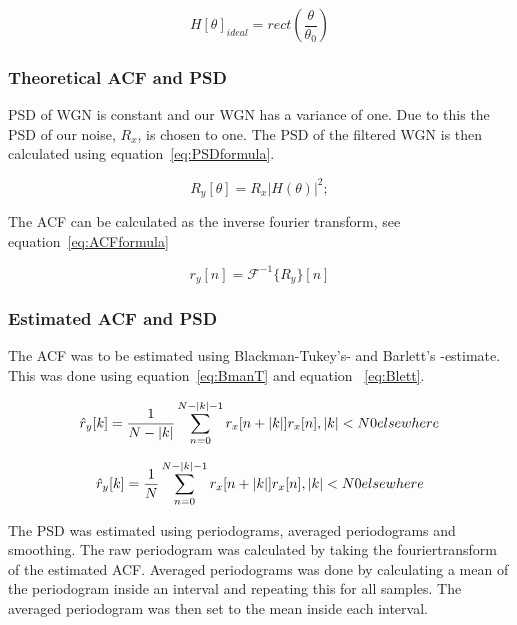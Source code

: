 \documentclass[10pt]{article}
\begin{document}
\begin{equation}
  \label{eq:idealH}
  H[\theta]_{ideal} =rect(\frac{\theta}{\theta_0} )
\end{equation}

\subsubsection{Theoretical ACF and PSD}
PSD of WGN is constant and our WGN has a variance of one. Due to this the PSD
of our noise, $R_x$, is chosen to one.
The PSD of the filtered WGN is then calculated using equation~\ref{eq:PSDformula}.

\begin{equation}
  \label{eq:PSDformula}
  R_y[\theta] = R_x|H(\theta)|^2;
\end{equation}

The ACF can be calculated as the inverse fourier transform, see equation~\ref{eq:ACFformula}

\begin{equation}
  \label{eq:ACFformula}
  r_y[n] = \mathcal{F}^{-1}\{R_y\}[n]
\end{equation}

\subsubsection{Estimated ACF and PSD}
The ACF was to be estimated using Blackman-Tukey's- and Barlett's -estimate.
This was done using equation~\ref{eq:BmanT} and equation ~\ref{eq:Blett}.

\begin{equation}
\label{eq:BmanT}
\hat{r}_y[k] = \frac{1}{N-|k|}\sum_{n=0}^{N-|k|-1}r_x[n+|k|]r_x[n], |k|<N \\
		0 elsewhere
\end{equation}

\begin{equation}
\label{eq:Blett}
\hat{r}_y[k] = \frac{1}{N}\sum_{n=0}^{N-|k|-1}r_x[n+|k|]r_x[n], |k|<N \\
		0 elsewhere
\end{equation}



The PSD was estimated using periodograms, averaged periodograms
and smoothing. The raw periodogram was calculated by taking the fouriertransform
of the estimated ACF.
Averaged periodograms was done by calculating a mean of the periodogram inside
an interval and repeating this for all samples. The averaged periodogram was
then set to the mean inside each interval.
\end{document}
